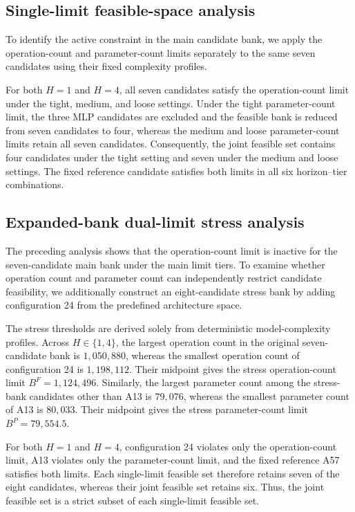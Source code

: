 \documentclass[11pt,a4paper]{article}
\begin{document}
\subsection{Single-limit feasible-space analysis}

To identify the active constraint in the main candidate bank, we apply the
operation-count and parameter-count limits separately to the same seven
candidates using their fixed complexity profiles.

For both $H=1$ and $H=4$, all seven candidates satisfy the operation-count
limit under the tight, medium, and loose settings. Under the tight
parameter-count limit, the three MLP candidates are excluded and the
feasible bank is reduced from seven candidates to four, whereas the medium
and loose parameter-count limits retain all seven candidates. Consequently,
the joint feasible set contains four candidates under the tight setting and
seven under the medium and loose settings. The fixed reference candidate
satisfies both limits in all six horizon--tier combinations.

\subsection{Expanded-bank dual-limit stress analysis}

The preceding analysis shows that the operation-count limit is inactive for
the seven-candidate main bank under the main limit tiers.
To examine whether operation count and parameter count can independently
restrict candidate feasibility, we additionally construct an eight-candidate
stress bank by adding configuration 24 from the predefined architecture
space.

The stress thresholds are derived solely from deterministic model-complexity
profiles. Across $H\in\{1,4\}$, the largest operation count in the
original seven-candidate bank is $1{,}050{,}880$, whereas the smallest
operation count of configuration 24 is $1{,}198{,}112$. Their midpoint gives
the stress operation-count limit $B^{F}=1{,}124{,}496$. Similarly, the
largest parameter count among the stress-bank candidates other than A13 is
$79{,}076$, whereas the smallest parameter count of A13 is $80{,}033$.
Their midpoint gives the stress parameter-count limit
$B^{P}=79{,}554.5$.

For both $H=1$ and $H=4$, configuration 24 violates only the
operation-count limit, A13 violates only the parameter-count limit, and the
fixed reference A57 satisfies both limits. Each single-limit feasible set
therefore retains seven of the eight candidates, whereas their joint
feasible set retains six. Thus, the joint feasible set is a strict subset
of each single-limit feasible set.
\end{document}
